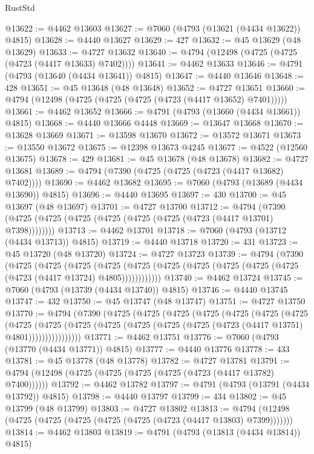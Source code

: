 \begin{lexlean}{RustStd}
\begin{coremodule}
{\begin{coremodule}
{{{{{{{{{{{{{{{{{{{{{{{{{{{{{{{{{{{{{{{{{{{{{{{{{{{{{{{{{{{{@13622 := @4462 @13603
@13627 := @7060 (@4793 (@13621 (@4434 @13622)) @4815)
@13628 := @4440 @13627
@13629 := 427
@13632 := @45 @13629 (@48 @13629)
@13633 := @4727 @13632
@13640 := @4794 (@12498 (@4725 (@4725 (@4723 (@4417 @13633) @7402))))
@13641 := @4462 @13633
@13646 := @4791 (@4793 (@13640 (@4434 @13641)) @4815)
@13647 := @4440 @13646
@13648 := 428
@13651 := @45 @13648 (@48 @13648)
@13652 := @4727 @13651
@13660 := @4794 (@12498 (@4725 (@4725 (@4725 (@4723 (@4417 @13652) @7401)))))
@13661 := @4462 @13652
@13666 := @4791 (@4793 (@13660 (@4434 @13661)) @4815)
@13668 := @4440 @13666 @4448
@13669 := @13647 @13668
@13670 := @13628 @13669
@13671 := @13598 @13670
@13672 := @13572 @13671
@13673 := @13550 @13672
@13675 := @12398 @13673 @4245
@13677 := @4522 (@12560 @13675)
@13678 := 429
@13681 := @45 @13678 (@48 @13678)
@13682 := @4727 @13681
@13689 := @4794 (@7390 (@4725 (@4725 (@4723 (@4417 @13682) @7402))))
@13690 := @4462 @13682
@13695 := @7060 (@4793 (@13689 (@4434 @13690)) @4815)
@13696 := @4440 @13695
@13697 := 430
@13700 := @45 @13697 (@48 @13697)
@13701 := @4727 @13700
@13712 := @4794 (@7390 (@4725 (@4725 (@4725 (@4725 (@4725 (@4725 (@4723 (@4417 @13701) @7398))))))))
@13713 := @4462 @13701
@13718 := @7060 (@4793 (@13712 (@4434 @13713)) @4815)
@13719 := @4440 @13718
@13720 := 431
@13723 := @45 @13720 (@48 @13720)
@13724 := @4727 @13723
@13739 := @4794
    (@7390
      (@4725
        (@4725
          (@4725
            (@4725 (@4725 (@4725 (@4725 (@4725 (@4725 (@4725 (@4723 (@4417 @13724) @4805))))))))))))
@13740 := @4462 @13724
@13745 := @7060 (@4793 (@13739 (@4434 @13740)) @4815)
@13746 := @4440 @13745
@13747 := 432
@13750 := @45 @13747 (@48 @13747)
@13751 := @4727 @13750
@13770 := @4794
    (@7390
      (@4725
        (@4725
          (@4725
            (@4725
              (@4725
                (@4725
                  (@4725
                    (@4725
                      (@4725
                        (@4725
                          (@4725 (@4725 (@4725 (@4725 (@4723 (@4417 @13751) @4801))))))))))))))))
@13771 := @4462 @13751
@13776 := @7060 (@4793 (@13770 (@4434 @13771)) @4815)
@13777 := @4440 @13776
@13778 := 433
@13781 := @45 @13778 (@48 @13778)
@13782 := @4727 @13781
@13791 := @4794 (@12498 (@4725 (@4725 (@4725 (@4725 (@4723 (@4417 @13782) @7400))))))
@13792 := @4462 @13782
@13797 := @4791 (@4793 (@13791 (@4434 @13792)) @4815)
@13798 := @4440 @13797
@13799 := 434
@13802 := @45 @13799 (@48 @13799)
@13803 := @4727 @13802
@13813 := @4794 (@12498 (@4725 (@4725 (@4725 (@4725 (@4725 (@4723 (@4417 @13803) @7399)))))))
@13814 := @4462 @13803
@13819 := @4791 (@4793 (@13813 (@4434 @13814)) @4815)
}}}}}}}}}}}}}}}}}}}}}}}}}}}}}}}}}}}}}}}}}}}}}}}}}}}}}}}}}}}}
\end{coremodule}}
\end{coremodule}
\end{lexlean}
